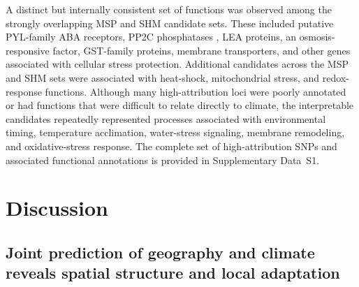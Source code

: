 \documentclass[]{article}
\begin{document}
A distinct but internally consistent set of functions was observed 
among the strongly overlapping MSP and SHM candidate sets. 
These included putative PYL-family ABA receptors, PP2C phosphatases \citep{park_abscisic_2009}, LEA proteins, 
an osmosis-responsive factor, GST-family proteins, membrane transporters, 
and other genes associated with cellular stress protection. 
Additional candidates across the MSP and SHM sets were associated with heat-shock, mitochondrial stress, and redox-response functions.
Although many high-attribution loci were 
poorly annotated or had functions that were difficult to relate directly to climate, 
the interpretable candidates repeatedly represented processes associated with 
environmental timing, temperature acclimation, water-stress signaling, 
membrane remodeling, and oxidative-stress response. %
The complete set of high-attribution SNPs and associated functional annotations is provided in Supplementary Data~S1.


\section{Discussion}

\subsection{Joint prediction of geography and climate reveals
spatial structure and local adaptation}
\end{document}
